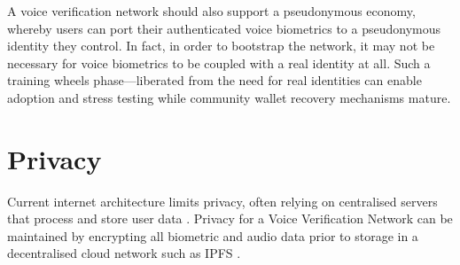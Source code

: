 \documentclass[11pt,a4paper]{article}
\begin{document}
A voice verification network should also support a pseudonymous economy, whereby users can port their authenticated voice biometrics to a pseudonymous identity they control.
In fact, in order to bootstrap the network, it may not be necessary for voice biometrics to be coupled with a real identity at all.
Such a \textquotesingle training wheels\textquotesingle{} phase---liberated from the need for real identities can enable adoption and stress testing while community wallet recovery mechanisms mature.

\section{Privacy}
\label{sec:results}
Current internet architecture limits privacy, often relying on centralised servers that process and store user data \cite{wang2021cogoverned}.
Privacy for a Voice Verification Network can be maintained by encrypting all biometric and audio data prior to storage in a decentralised cloud network such as IPFS \cite{ipfs2023interplanetary}.
\end{document}
